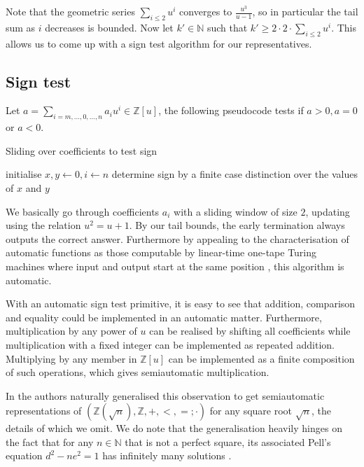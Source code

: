\documentclass[british,a4paper,11pt,abstract=on]{scrreprt}
\theoremstyle{definition}
\theoremstyle{remark}
\newcommand{\N}{\mathbb{N}}
\newcommand{\Z}{\mathbb{Z}}
\begin{document}
Note that the geometric series \(\sum_{i\leq 2} u^i\) converges to \(\frac{u^3}{u-1}\),
so in particular the tail sum as \(i\) decreases is bounded.
Now let \(k' \in \N\) such that \(k' \geq 2\cdot2\cdot\sum_{i\leq 2}u^i\).
This allows us to come up with a sign test algorithm for our representatives.

\subsection{Sign test}

Let \(a = \sum_{i=m,\dots,0,\dots,n} a_i u^i \in \Z[u]\), the following pseudocode tests if \(a>0, a=0\) or \(a<0\).
\begin{algorithm}
    \caption{Sliding over coefficients to test sign}
    \DontPrintSemicolon
    initialise \(x, y \leftarrow 0, i\leftarrow n\)\;
    determine sign by a finite case distinction over the values of \(x\) and \(y\)
\end{algorithm}

We basically go through coefficients \(a_i\) with a sliding window of size \(2\), updating using the relation \(u^2 = u + 1\).
By our tail bounds, the early termination always outputs the correct answer.
Furthermore by appealing to the characterisation of automatic functions as those computable by linear-time one-tape Turing machines
where input and output start at the same position \autocite{Case2012}, this algorithm is automatic.

With an automatic sign test primitive, it is easy to see that addition, comparison and equality could be implemented in an automatic matter.
Furthermore, multiplication by any power of \(u\) can be realised by shifting all coefficients while multiplication with a fixed integer can be implemented as repeated addition.
Multiplying by any member in \(\Z[u]\) can be implemented as a finite composition of such operations, which gives semiautomatic multiplication.

In \autocite{semiauto} the authors naturally generalised this observation to get semiautomatic representations of
\((\Z(\sqrt{n}), \Z, +, <, =;\cdot)\) for any square root \(\sqrt{n}\), the details of which we omit.
We do note that the generalisation heavily hinges on the fact that for any \(n\in\N\) that is not a perfect square,
its associated Pell's equation \(d^2 - ne^2 = 1\) has infinitely many solutions \autocite{lagrange}.
\end{document}
